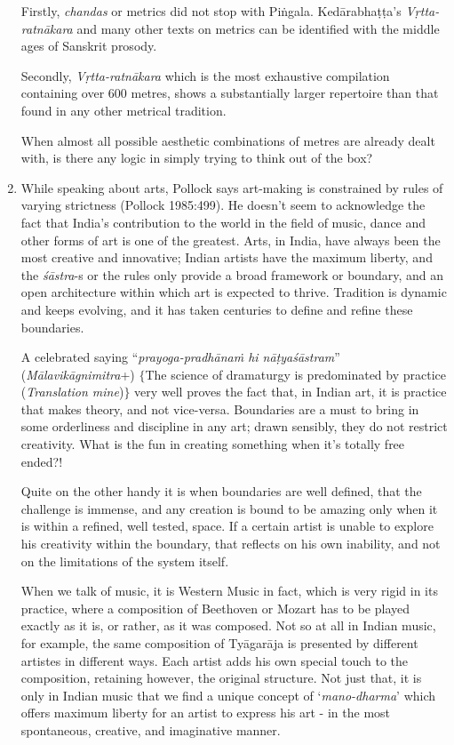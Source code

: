 \begin{enumerate}
Firstly, {\it chandas} or metrics did not stop with Piṅgala. Kedārabhaṭṭa's \textsl{Vṛtta-ratnākara} and many other texts on metrics can be identified with the middle ages of Sanskrit prosody. 

Secondly, {\it Vṛtta-ratnākara} which is the most exhaustive compilation containing over 600 metres,  shows a substantially larger repertoire than that found in any other metrical tradition. 

When almost all possible aesthetic combinations of metres are already dealt with, is there any logic in simply trying to think out of the box?  

\item While speaking about arts, Pollock says art-making is constrained by rules of varying strictness (Pollock 1985:499). He doesn't seem to acknowledge the fact that India's contribution to the world in the field of music, dance and other forms of art is one of the greatest. Arts, in India, have always been the most creative and innovative; Indian artists have the maximum liberty, and the {\it śāstra}-s or the rules only provide a broad framework or boundary, and an open architecture within which art is expected to thrive. Tradition is dynamic and keeps evolving, and it has taken centuries to define and refine these boundaries. 

A celebrated saying ``\textsl{prayoga-pradhānaṁ hi nāṭyaśāstram}'' ({\it Mālavikāgnimitra}+) $\{$The science of dramaturgy is predominated by practice (\textsl{Translation mine})$\}$ very well proves the fact that, in Indian art, it is practice that makes theory, and not vice-versa. Boundaries are a must to bring in some orderliness and discipline in any art; drawn sensibly, they do not restrict creativity. What is the fun in creating something when it's totally free ended?! 

Quite on the other handy it is when boundaries are well defined, that the challenge is immense, and any creation is bound to be amazing only when it is within a refined, well tested, space. If a certain artist is unable to explore his creativity within the boundary, that reflects on his own inability, and not on the limitations of the system itself. 

When we talk of music, it is Western Music in fact, which is very rigid in its practice, where a composition of Beethoven or Mozart has to be played exactly as it is, or rather, as it was composed. Not so at all in Indian music, for example, the same composition of Tyāgarāja is presented by different artistes in different ways. Each artist adds his own special touch to the composition, retaining however, the original structure. Not just that, it is only in Indian music that we find a unique concept of `{\it mano-dharma}' which offers maximum liberty for an artist to express his art - in the most spontaneous, creative, and imaginative manner. 


\end{enumerate}
